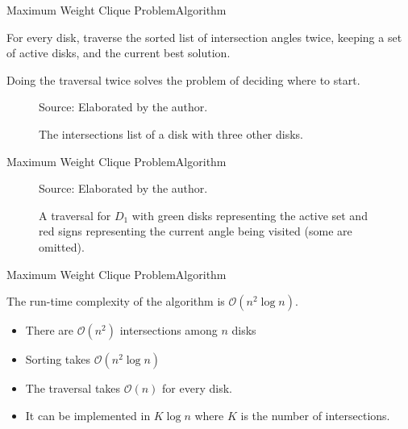 \documentclass{beamer}
\newcommand{\bigO}{\mathscr{O}}
\newcommand{\source}[1]{\caption*{Source: {#1}} }
\begin{document}
\begin{frame}{Maximum Weight Clique Problem}{Algorithm}
	
	For every disk, traverse the sorted list of intersection angles twice, keeping a set of active disks, and the current best solution.
	
	Doing the traversal twice solves the problem of deciding where to start.
	
\begin{figure}[H]
	\centering
	
	\caption{The intersections list of a disk with three other disks.}
	
	\source{Elaborated by the author.}
	\label{fig:array_disks}
\end{figure}
\end{frame}

	
%	

\begin{frame}{Maximum Weight Clique Problem}{Algorithm}

	\begin{figure}
		\caption{A traversal for $D_1$ with green disks representing the active set and red signs representing the current angle being visited (some are omitted).}
			\source{Elaborated by the author.}
	\end{figure}
\end{frame}


\begin{frame}{Maximum Weight Clique Problem}{Algorithm}
	
	The run-time complexity of the algorithm is $\bigO(n^2\log{n})$.
	
	\begin{itemize}
		\item There are $\bigO(n^2)$ intersections among $n$ disks
		
		\item Sorting takes $\bigO(n^2\log{n})$
		
		\item The traversal takes $\bigO(n)$ for every disk.
		
		\item It can be implemented in $K\log{n}$ where $K$ is the number of intersections.
	\end{itemize}

\end{frame}
\end{document}
